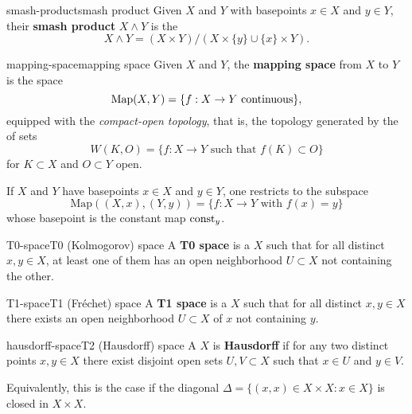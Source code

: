 \begin{topic}{smash-product}{smash product}
    Given  $X$ and $Y$ with basepoints $x \in X$ and $y \in Y$, their \textbf{smash product} $X \wedge Y$ is the 
    \[ X \wedge Y = (X \times Y) / (X \times \{ y \} \cup \{ x \} \times Y) . \]
\end{topic}

\begin{topic}{mapping-space}{mapping space}
    Given  $X$ and $Y$, the \textbf{mapping space} from $X$ to $Y$ is the space
    \[ \textup{Map}(X, Y) = \{ f : X \to Y \text{ continuous} \} , \]
    equipped with the \textit{compact-open topology}, that is, the topology generated by the  of sets
    \[ W(K, O) = \{ f : X \to Y \text{ such that } f(K) \subset O \} \]
    for $K \subset X$  and $O \subset Y$ open.
    
    If $X$ and $Y$ have basepoints $x \in X$ and $y \in Y$, one restricts to the subspace
    \[ \text{Map}((X, x), (Y, y)) = \{ f : X \to Y \text{ with } f(x) = y \} \]
    whose basepoint is the constant map $\textup{const}_y$.
\end{topic}

\begin{topic}{T0-space}{T0 (Kolmogorov) space}
    A \textbf{T0 space} is a  $X$ such that for all distinct $x, y \in X$, at least one of them has an open neighborhood $U \subset X$ not containing the other.
\end{topic}

\begin{topic}{T1-space}{T1 (Fréchet) space}
    A \textbf{T1 space} is a  $X$ such that for all distinct $x, y \in X$ there exists an open neighborhood $U \subset X$ of $x$ not containing $y$.
\end{topic}

\begin{topic}{hausdorff-space}{T2 (Hausdorff) space}
    A  $X$ is \textbf{Hausdorff} if for any two distinct points $x, y \in X$ there exist disjoint open sets $U, V \subset X$ such that $x \in U$ and $y \in V$.
    
    Equivalently, this is the case if the diagonal $\Delta = \{ (x, x) \in X \times X : x \in X \}$ is closed in $X \times X$.
\end{topic}

